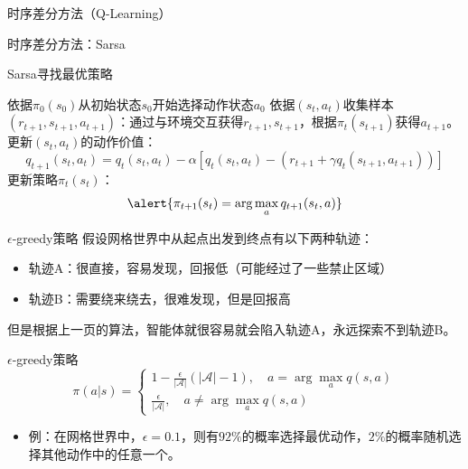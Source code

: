 \begin{section}{时序差分方法\alert{（Q-Learning）}}
\begin{frame}{时序差分方法：Sarsa}
    \begin{block}{Sarsa寻找最优策略}
        \begin{algorithmic}[1]
                \State 依据$\pi_0(s_0)$从初始状态$s_0$开始选择动作状态$a_0$
                    \State 依据$(s_t,a_t)$收集样本$(r_{t+1},s_{t+1},a_{t+1})$：通过与环境交互获得$r_{t+1},s_{t+1}$，根据$\pi_t(s_{t+1})$获得$a_{t+1}$。
                    \State 更新$(s_t, a_t)$的动作价值：
                    \[
                        q_{t+1}(s_t,a_t)=q_t(s_t,a_t)-\alpha[q_t(s_t,a_t)-(r_{t+1}+\gamma q_t(s_{t+1},a_{t+1}))]
                    \]
                    \State \alert{更新策略$\pi_t(s_t)$}：
                    \[
                        \alert{\pi_{t+1}(s_t)=\arg\max_a q_{t+1}(s_t,a)}
                    \]
                \EndIf
            \EndFor
        \end{algorithmic}
    \end{block}
\end{frame}

\begin{frame}{$\epsilon$-greedy策略}
    假设网格世界中从起点出发到终点有以下两种轨迹：
    \begin{itemize}
        \item 轨迹A：很直接，容易发现，回报低（可能经过了一些禁止区域）
        \item 轨迹B：需要绕来绕去，很难发现，但是回报高
    \end{itemize}
    但是根据上一页的算法，智能体就很容易就会陷入轨迹A，永远探索不到轨迹B。
    \begin{block}{$\epsilon$-greedy策略}
        \[
            \pi(a|s)=\begin{cases}
                1-\frac{\epsilon}{|\mathcal{A}|}(|\mathcal{A}|-1),\quad a=\arg\max_{a}q(s,a) \\
                \frac{\epsilon}{|\mathcal{A}|},\quad a \neq \arg\max_{a}q(s,a)
            \end{cases}
        \]
    \end{block}
    \begin{itemize}
        \item 例：在网格世界中，$\epsilon=0.1$，则有$92\%$的概率选择最优动作，$2\%$的概率随机选择其他动作中的任意一个。
    \end{itemize}
\end{frame}


\end{section}
